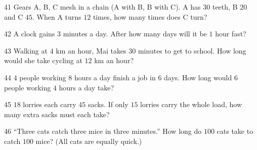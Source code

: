 \gap
\begin{probbox}{41}{}
Gears A, B, C mesh in a chain (A with B, B with C). A has $30$ teeth, B $20$ and C $45$. When A turns $12$ times, how many times does C turn?
\end{probbox}
\gap
\begin{probbox}{42}{}
A clock gains $3$ minutes a day. After how many days will it be $1$ hour fast?
\end{probbox}
\gap
\begin{probbox}{43}{}
Walking at $4$ km an hour, Mai takes $30$ minutes to get to school. How long would she take cycling at $12$ km an hour?
\end{probbox}
\gap
\begin{probbox}{44}{}
$4$ people working $8$ hours a day finish a job in $6$ days. How long would $6$ people working $4$ hours a day take?
\end{probbox}
\gap
\begin{probbox}{45}{}
$18$ lorries each carry $45$ sacks. If only $15$ lorries carry the whole load, how many extra sacks must each take?
\end{probbox}
\gap
\begin{probbox}{46}{}
``Three cats catch three mice in three minutes.'' How long do $100$ cats take to catch $100$ mice? (All cats are equally quick.)
\end{probbox}
\gap
